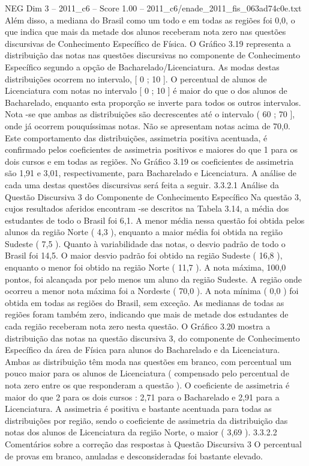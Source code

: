 \begin{textsample}{NEG Dim 3 – 2011\_c6 – Score 1.00 – 2011\_c6/enade\_2011\_fis\_063ad74c0e.txt}
Além disso, a mediana do Brasil como um todo e em todas as regiões foi 0,0, o que indica que mais da metade dos alunos receberam nota zero nas questões discursivas de Conhecimento Específico de Física.
O Gráfico 3.19 representa a distribuição das notas nas questões discursivas no componente de Conhecimento Específico segundo a opção de Bacharelado/Licenciatura.
As modas destas distribuições ocorrem no intervalo, [ 0 ; 10 ].
O percentual de alunos de Licenciatura com notas no intervalo [ 0 ; 10 ] é maior do que o dos alunos de Bacharelado, enquanto esta proporção se inverte para todos os outros intervalos.
Nota -se que ambas as distribuições são decrescentes até o intervalo ( 60 ; 70 ], onde já ocorrem pouquíssimas notas.
Não se apresentam notas acima de 70,0.
Este comportamento das distribuições, assimetria positiva acentuada, é confirmado pelos coeficientes de assimetria positivos e maiores do que 1 para os dois cursos e em todas as regiões.
No Gráfico 3.19 os coeficientes de assimetria são 1,91 e 3,01, respectivamente, para Bacharelado e Licenciatura.
A análise de cada uma destas questões discursivas será feita a seguir. 3.3.2.1 Análise da Questão Discursiva 3 do Componente de Conhecimento Específico Na questão 3, cujos resultados aferidos encontram -se descritos na Tabela 3.14, a média dos estudantes de todo o Brasil foi 6,1.
A menor média nessa questão foi obtida pelos alunos da região Norte ( 4,3 ), enquanto a maior média foi obtida na região Sudeste ( 7,5 ).
Quanto à variabilidade das notas, o desvio padrão de todo o Brasil foi 14,5.
O maior desvio padrão foi obtido na região Sudeste ( 16,8 ), enquanto o menor foi obtido na região Norte ( 11,7 ).
A nota máxima, 100,0 pontos, foi alcançada por pelo menos um aluno da região Sudeste.
A região onde ocorreu a menor nota máxima foi a Nordeste ( 70,0 ).
A nota mínima ( 0,0 ) foi obtida em todas as regiões do Brasil, sem exceção.
As medianas de todas as regiões foram também zero, indicando que mais de metade dos estudantes de cada região receberam nota zero nesta questão.
O Gráfico 3.20 mostra a distribuição das notas na questão discursiva 3, do componente de Conhecimento Específico da área de Física para alunos do Bacharelado e da Licenciatura.
Ambas as distribuição têm moda nas questões em branco, com percentual um pouco maior para os alunos de Licenciatura ( compensado pelo percentual de nota zero entre os que responderam a questão ).
O coeficiente de assimetria é maior do que 2 para os dois cursos : 2,71 para o Bacharelado e 2,91 para a Licenciatura.
A assimetria é positiva e bastante acentuada para todas as distribuições por região, sendo o coeficiente de assimetria da distribuição das notas dos alunos de Licenciatura da região Norte, o maior ( 3,69 ). 3.3.2.2 Comentários sobre a correção das respostas à Questão Discursiva 3 O percentual de provas em branco, anuladas e desconsideradas foi bastante elevado.

\end{textsample}

